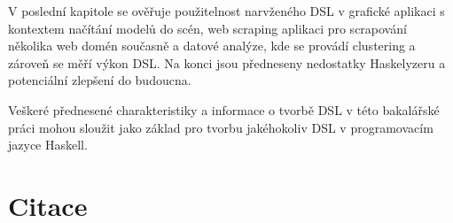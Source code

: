 \documentclass[male,czech]{kithesis}
\begin{document}
V poslední kapitole se ověřuje použitelnost narvženého DSL v 
grafické aplikaci s kontextem načítání modelů do scén,
web scraping aplikaci pro scrapování několika web domén současně a 
datové analýze, 
kde se provádí clustering a zároveň se měří výkon DSL.
Na konci jsou předneseny nedostatky Haskelyzeru a 
potenciální zlepšení do budoucna.

Veškeré přednesené charakteristiky a 
informace o tvorbě DSL v této bakalářské práci
mohou sloužit jako základ pro tvorbu jakéhokoliv DSL v programovacím jazyce Haskell.

\chapter{Citace}


\printbibliography[heading=none]
\appendix
\end{document}
